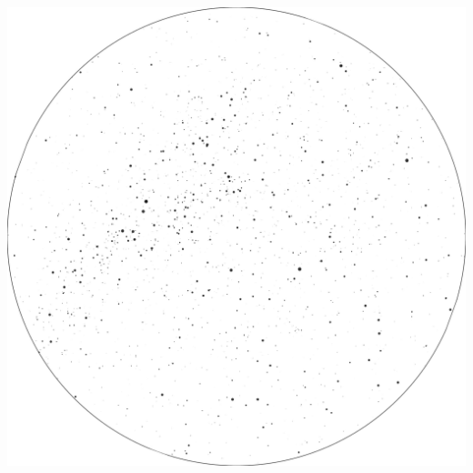 \documentclass{./SAS-class-skygen}
\begin{document}
	\vspace{0.5cm}
    \begin{center}
    \includegraphics[width=\textwidth]{./pics/skychart23.png}
    \end{center}
    
    
\end{document}
